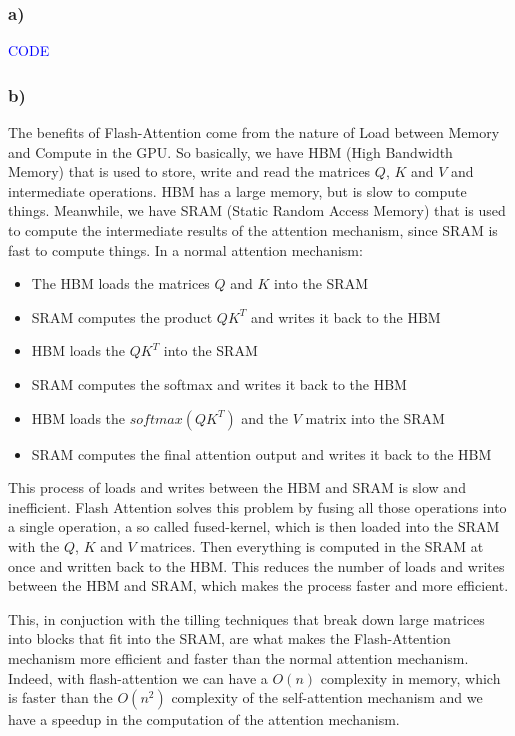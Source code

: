 \documentclass{article}
\begin{document}
\subsubsection*{a)}

\textcolor{blue}{CODE}

\subsubsection*{b)}

The benefits of Flash-Attention come from the nature of Load between Memory and Compute in the GPU. So basically, we have HBM (High Bandwidth Memory)
that is used to store, write and read the matrices $Q$, $K$ and $V$ and intermediate operations. HBM has a large memory, but is slow to compute things. Meanwhile, we have
SRAM (Static Random Access Memory) that is used to compute the intermediate results of the attention mechanism, since SRAM is fast to compute things.
In a normal attention mechanism:

\begin{itemize}
    \item The HBM loads the matrices $Q$ and $K$ into the SRAM
    \item SRAM computes the product $QK^T$ and writes it back to the HBM
    \item HBM loads the $QK^T$ into the SRAM
    \item SRAM computes the softmax and writes it back to the HBM
    \item HBM loads the $softmax(QK^T)$ and the $V$ matrix into the SRAM
    \item SRAM computes the final attention output and writes it back to the HBM
\end{itemize}

This process of loads and writes between the HBM and SRAM is slow and inefficient.
Flash Attention solves this problem by fusing all those operations into a single operation,
a so called fused-kernel, which is then loaded into the SRAM with the $Q$, $K$ and $V$ matrices. Then everything is computed in the SRAM
at once and written back to the HBM. This reduces the number of loads and writes between the HBM and SRAM, which makes the process
faster and more efficient.

This, in conjuction with the tilling techniques that break down large matrices into blocks that fit into the SRAM, are
what makes the Flash-Attention mechanism more efficient and faster than the normal attention mechanism. Indeed,
with flash-attention we can have a $O(n)$ complexity in memory, which is faster than the $O(n^2)$ complexity of the self-attention mechanism
and we have a speedup in the computation of the attention mechanism.
\end{document}

